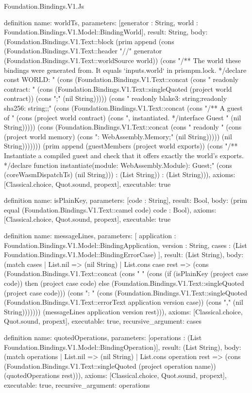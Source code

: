 \begin{lexlean}{Foundation.Bindings.V1.Js}
\begin{semanticmodule}
definition{
  name: worldTs,
  parameters: [generator : String, world : Foundation.Bindings.V1.Model::BindingWorld],
  result: String,
  body: (Foundation.Bindings.V1.Text::block (prim append (cons (Foundation.Bindings.V1.Text::header "//" generator (Foundation.Bindings.V1.Text::worldSource world)) (cons "/** The world these bindings were generated from. It equals `inputs.world` in prismpm.lock. */\nexport declare const WORLD: {" (cons (Foundation.Bindings.V1.Text::concat (cons "  readonly contract: " (cons (Foundation.Bindings.V1.Text::singleQuoted (project world contract)) (cons ";" (nil String))))) (cons "  readonly blake3: string;\n  readonly sha256: string;\n};\n" (cons (Foundation.Bindings.V1.Text::concat (cons "/** A guest of " (cons (project world contract) (cons ", instantiated. */\nexport interface Guest {" (nil String))))) (cons (Foundation.Bindings.V1.Text::concat (cons "  readonly " (cons (project world memory) (cons ": WebAssembly.Memory;" (nil String))))) (nil String))))))) (prim append (guestMembers (project world exports)) (cons "}\n\n/** Instantiate a compiled guest and check that it offers exactly the world's exports. */\nexport declare function instantiate(module: WebAssembly.Module): Guest;\n" (cons (coreWasmDispatchTs) (nil String))) : (List String)) : (List String))),
  axioms: [Classical.choice, Quot.sound, propext],
  executable: true
}

definition{
  name: isPlainKey,
  parameters: [code : String],
  result: Bool,
  body: (prim equal (Foundation.Bindings.V1.Text::camel code) code : Bool),
  axioms: [Classical.choice, Quot.sound, propext],
  executable: true
}

definition{
  name: messageLines,
  parameters: [
    application : Foundation.Bindings.V1.Model::BindingApplication,
    version : String,
    cases : (List Foundation.Bindings.V1.Model::BindingErrorCase)
  ],
  result: (List String),
  body: (match cases
    | List.nil => (nil String)
    | List.cons case rest => (cons (Foundation.Bindings.V1.Text::concat (cons "  " (cons (if (isPlainKey (project case code)) then (project case code) else (Foundation.Bindings.V1.Text::singleQuoted (project case code))) (cons ": " (cons (Foundation.Bindings.V1.Text::singleQuoted (Foundation.Bindings.V1.Text::errorText application version case)) (cons "," (nil String))))))) (messageLines application version rest))),
  axioms: [Classical.choice, Quot.sound, propext],
  executable: true,
  recursive_argument: cases
}

definition{
  name: quotedOperations,
  parameters: [operations : (List Foundation.Bindings.V1.Model::BindingOperation)],
  result: (List String),
  body: (match operations
    | List.nil => (nil String)
    | List.cons operation rest => (cons (Foundation.Bindings.V1.Text::singleQuoted (project operation name)) (quotedOperations rest))),
  axioms: [Classical.choice, Quot.sound, propext],
  executable: true,
  recursive_argument: operations
}


\end{semanticmodule}
\end{lexlean}
